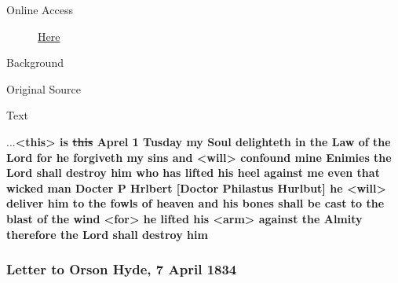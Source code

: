 				\begin{description}
					\item[Online Access] \href{https://www.josephsmithpapers.org/paper-summary/journal-1832-1834/68}{Here}
				\end{description}
				
				\begin{description}
					\item[Background]
				\end{description}
				
				
				\begin{description}
					\item[Original Source]
				\end{description}
				
				
				\begin{description}
					\item[Text]
				\end{description}
				
					...\textbf{<this> is \sout{this} Aprel 1 Tusday my Soul delighteth in the Law of the Lord for he forgiveth my sins and <will> confound mine Enimies the Lord shall destroy him who has lifted his heel against me even that wicked man Docter P Hrlbert [Doctor Philastus Hurlbut] he <will> deliver him to the fowls of heaven and his bones shall be cast to the blast of the wind <for> he lifted his <arm> against the Almity therefore the Lord shall destroy him}
					
		\subsubsection{Letter to Orson Hyde, 7 April 1834}
			\label{EMS-1834-JS-7-APR-1834}
			
